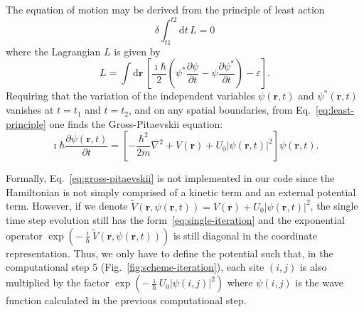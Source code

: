 The equation of motion may be derived from the principle of least action 
\begin{equation}
\delta \int_{t1}^{t2} \mathrm{d} t \, L = 0 \label{eq:least-principle}
\end{equation}
where the Lagrangian $L$ is given by
\begin{equation}
L = \int \mathrm{d} \textbf{r} \, \left[ \frac{\imath \hbar}{2} \left( \psi^\ast \frac{\partial \psi}{\partial t} - \psi \frac{\partial \psi^\ast}{\partial t} \right) - \varepsilon \right].
\end{equation}
Requiring that the variation of the independent variables $\psi(\textbf{r},t)$ and $\psi^\ast (\textbf{r},t)$ vanishes at $t=t_1$ and $t=t_2$, and on any spatial boundaries, from Eq.~\eqref{eq:least-principle} one finds the Gross-Pitaevskii equation:
\begin{equation} \label{eq:gross-pitaevskii}
\imath \hbar \frac{\partial \psi(\textbf{r}, t)}{\partial t} = \left[ - \frac{\hbar^2}{2m} \nabla^2 + V(\textbf{r}) + U_0 |\psi(\textbf{r}, t)|^2 \right] \psi(\textbf{r}, t).
\end{equation}

Formally, Eq.~\eqref{eq:gross-pitaevskii} is not implemented in our code since the Hamiltonian is not simply comprised of a kinetic term and an external potential term. However, if we denote $\tilde{V}(\textbf{r}, \psi(\textbf{r}, t)) = V(\textbf{r}) + U_0 |\psi(\textbf{r}, t)|^2$, the single time step evolution still has the form~\eqref{eq:single-iteration} and the exponential operator $\exp \left( - \frac{\imath}{\hbar} \tilde{V}(\textbf{r}, \psi(\textbf{r}, t)) \right)$ is still diagonal in the coordinate representation. Thus, we only have to define the potential such that, in the computational step 5 (Fig.~\ref{fig:scheme-iteration}), each site $(i,j)$ is also multiplied by the factor $\exp(-\frac{\imath}{\hbar} U_0 |\psi(i,j)|^2)$ where $\psi(i,j)$ is the wave function calculated in the previous computational step.

